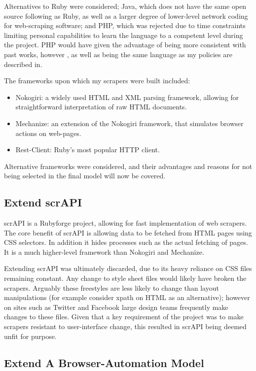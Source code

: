 Alternatives to Ruby were considered; Java, which does not have the same open source following as Ruby, as well as a larger degree of lower-level network coding for web-scraping software; and PHP, which was rejected due to time constraints limiting personal capabilities to learn the language to a competent level during the project. PHP would have given the advantage of being more consistent with past works, however \cite{GRAft}, as well as being the same language as my policies are described in. 

The frameworks upon which my scrapers were built included:

\begin{itemize}
 \item Nokogiri: a widely used HTML and XML parsing framework, allowing for straightforward interpretation of raw HTML documents.
 \item Mechanize: an extension of the Nokogiri framework, that simulates browser actions on web-pages.
 \item Rest-Client: Ruby's most popular HTTP client.
\end{itemize}

Alternative frameworks were considered, and their advantages and reasons for not being selected in the final model will now be covered.

\subsection{Extend scrAPI}

scrAPI is a Rubyforge project, allowing for fast implementation of web scrapers. The core benefit of scrAPI is allowing data to be fetched from HTML pages using CSS selectors. In addition it hides processes such as the actual fetching of pages. It is a much higher-level framework than Nokogiri and Mechanize. 

Extending scrAPI was ultimately discarded, due to its heavy reliance on CSS files remaining constant. Any change to style sheet files would likely have broken the scrapers. Arguably these freestyles are less likely to change than layout manipulations (for example consider xpath on HTML as an alternative); however on sites such as Twitter and Facebook large design teams frequently make changes to these files. Given that a key requirement of the project was to make scrapers resistant to user-interface change, this resulted in scrAPI being deemed unfit for purpose. 

\subsection{Extend A Browser-Automation Model}

